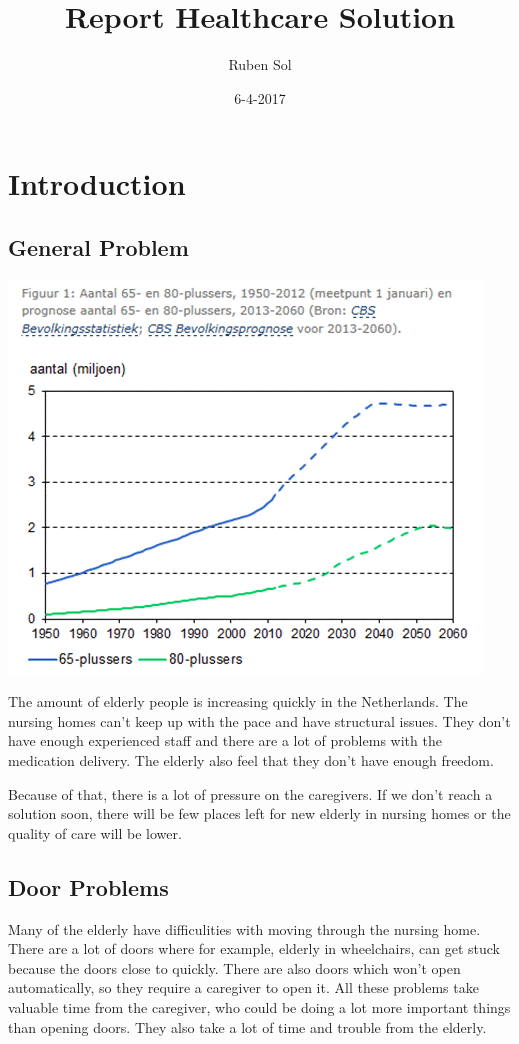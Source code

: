 \documentclass[14pt, a4paper]{extarticle}
\title{Report Healthcare Solution}
\date{6-4-2017}
\author{Ruben Sol}
\begin{document}
	\nocite{*}
	\maketitle
	
	\newpage
	\tableofcontents
	
	\newpage
	\section{Introduction}
	\subsection{General Problem}
	
	\includegraphics[scale=0.75]{vergrijzing1}
	
	
	
	The amount of elderly people is increasing quickly in the Netherlands. \cite{bevolkingspiramide} The nursing homes can't keep up with the pace and have structural issues. They don't have enough experienced staff and there are a lot of problems with the medication delivery. The elderly also feel that they don't have enough freedom. \cite{structureleproblemen}	 
	
	Because of that, there is a lot of pressure on the caregivers. If we don't reach a solution soon, there will be few places left for new elderly in nursing homes or the quality of care will be lower.
	
	\subsection{Door Problems}
	Many of the elderly have difficulities with moving through the nursing home. There are a lot of doors where for example, elderly in wheelchairs, can get stuck because the doors close to quickly. There are also doors which won't open automatically, so they require a caregiver to open it. All these problems take valuable time from the caregiver, who could be doing a lot more important things than opening doors. They also take a lot of time and trouble from the elderly. 
	
\end{document}
